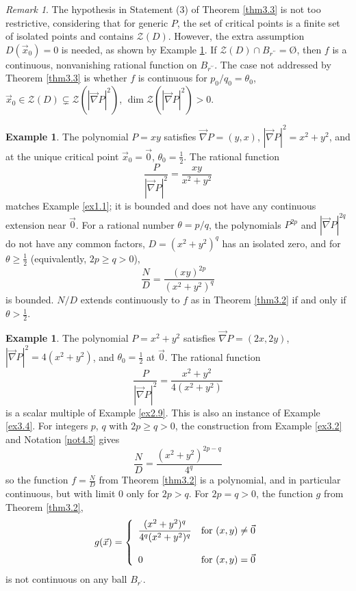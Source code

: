 \documentclass[12pt]{amsart}
\theoremstyle{definition}
\newtheorem{example}[thm]{Example}
\theoremstyle{remark}
\newtheorem{rem}[thm]{Remark}
\numberwithin{equation}{section}
\newcommand{\vv}{\mathcal{Z}}
\begin{document}
\begin{rem}\label{rem7.5}
    The hypothesis in Statement (3) of Theorem \ref{thm3.3} is not too restrictive, considering that for generic $P$, the set of critical points is a finite set of isolated points and contains $\vv(D)$.  However, the extra assumption $D(\vec x_0)=0$ is needed, as shown by Example \ref{ex4.5}.   If $\vv(D)\cap B_{r^{\prime\prime}}=\mbox{\O}$, then $f$ is a continuous, nonvanishing rational function on $B_{r^{\prime\prime}}$.  The case not addressed by Theorem \ref{thm3.3} is whether $f$ is continuous for $p_0/q_0=\theta_0$, $\vec x_0\in\vv(D)\subsetneq\vv(|\vec\nabla P|^2)$, $\dim\vv(|\vec\nabla P|^2)>0$.
\end{rem}

\begin{example}\label{ex4.4}
  The polynomial $P=xy$ satisfies $\vec\nabla P=(y,x)$, $|\vec\nabla P|^2=x^2+y^2$, and at the unique critical point $\vec x_0=\vec0$, $\theta_0=\frac12$.  The rational function $$\frac P{|\vec\nabla P|^2}=\frac{xy}{x^2+y^2}$$ matches Example \ref{ex1.1}; it is bounded and does not have any continuous extension near $\vec0$.  For a rational number $\theta=p/q$, the polynomials $P^{2p}$ and $|\vec\nabla P|^{2q}$ do not have any common factors, $D=(x^2+y^2)^q$ has an isolated zero, and for $\theta\ge\frac12$ (equivalently, $2p\ge q>0$), $$\frac ND=\frac{(xy)^{2p}}{(x^2+y^2)^{q}}$$ is bounded.  $N/D$ extends continuously to $f$ as in Theorem \ref{thm3.2} if and only if $\theta>\frac12$.
\end{example}
\begin{example}\label{ex4.5}
    The polynomial $P=x^2+y^2$ satisfies $\vec\nabla P=(2x,2y)$, $|\vec\nabla P|^2=4(x^2+y^2)$, and $\theta_0=\frac12$ at $\vec0$.  The rational function $$\frac P{|\vec\nabla P|^2}=\frac{x^2+y^2}{4(x^2+y^2)}$$ is a scalar multiple of  Example \ref{ex2.9}.  This is also an instance of Example \ref{ex3.4}.  For integers $p$, $q$ with $2p\ge q>0$, the construction from Example \ref{ex3.2} and Notation \ref{not4.5} gives $$\frac ND=\frac{(x^2+y^2)^{2p-q}}{4^q}$$ so the function $f=\frac ND$ from Theorem \ref{thm3.2} is a polynomial, and in particular continuous, but with limit $0$ only for $2p>q$.  For $2p=q>0$, the function $g$ from Theorem \ref{thm3.2}, $$g(\vec x)=\left\{\begin{array}{ll}{\displaystyle{\frac{(x^2+y^2)^{q}}{4^q(x^2+y^2)^{q}}}} & \mbox{\rm{for} $(x,y)\ne\vec0$}\\ & \\0& \mbox{\rm{for} $(x,y)=\vec0$} \end{array}\right.$$  is not continuous on any ball $B_{r^\prime}$.
\end{example}
\end{document}
